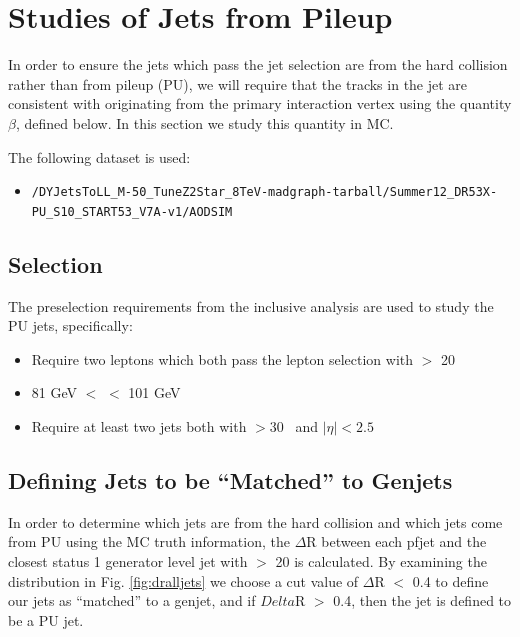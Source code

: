 \clearpage

\section{Studies of Jets from Pileup}
\label{sec:pujets}

In order to ensure the jets which pass the jet selection are from the hard collision rather than from pileup (PU), 
we will require that the tracks in the jet are consistent with originating from the primary interaction vertex
using the quantity $\beta$, defined below.
In this section we study this quantity in MC.

The following dataset is used:

\begin{itemize}
\scriptsize
\item \verb=/DYJetsToLL_M-50_TuneZ2Star_8TeV-madgraph-tarball/Summer12_DR53X-PU_S10_START53_V7A-v1/AODSIM=
\end{itemize}

\subsection{Selection}
The preselection requirements from the inclusive analysis are used to study the PU jets, specifically:

\begin{itemize}
\item Require two leptons which both pass the lepton selection with \pt $>$ 20 \GeVc 
\item 81 GeV $<$ \mll $<$ 101 GeV
\item Require at least two jets both with \pt $> 30$ \GeVc~and $|\eta| < 2.5$ 
\end{itemize}

\subsection{Defining Jets to be ``Matched'' to Genjets}
In order to determine which jets are from the hard collision and which jets come from PU using the MC truth information, the $\Delta$R between each pfjet and the closest status 1 generator level jet with \pt $>$ 20 \GeVc is calculated. By examining the distribution in Fig. \ref{fig:dralljets} we choose a cut value of $\Delta$R $<$ 0.4 to define our jets as ``matched'' to a genjet, and if $Delta$R $>$ 0.4, then the jet is defined to be a PU jet.

